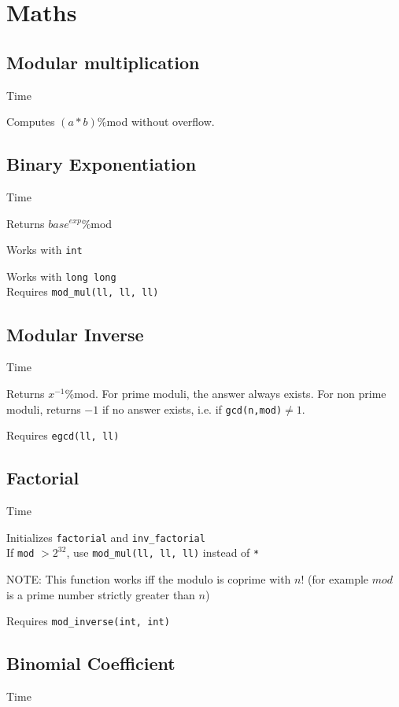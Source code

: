 \section{Maths}


\subsection{Modular multiplication}
 Time

Computes $(a * b)$\:\%\:mod without overflow.



\subsection{Binary Exponentiation}
 Time

Returns ${base^{exp}}$\:\%\:mod

Works with \verb|int|


Works with \verb|long long| \\
Requires \verb|mod_mul(ll, ll, ll)|



\subsection{Modular Inverse}
 Time

Returns ${x^{-1}}$\:\%\:mod. For prime moduli, the answer always exists. For non prime moduli, returns $-1$ if no answer exists, i.e. if \verb|gcd(n,mod)|$ \neq 1$.

Requires \verb|egcd(ll, ll)|



\subsection{Factorial}
 Time

Initializes \verb|factorial| and \verb|inv_factorial| \\
If \verb|mod| $> 2^{32}$, use \verb|mod_mul(ll, ll, ll)| instead of \verb|*|

NOTE: This function works iff the modulo is coprime with $n!$
(for example $mod$ is a prime number strictly greater than $n$)

Requires \verb|mod_inverse(int, int)|



\subsection{Binomial Coefficient}
 Time

